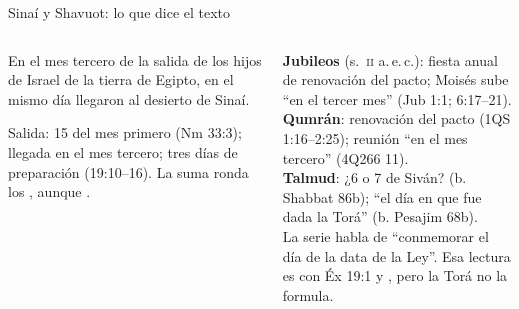 \begin{frame}{Sinaí y Shavuot: lo que dice el texto}
\begin{columns}[t,onlytextwidth]
\begin{column}{0.47\textwidth}
\centering{}\par
\begin{cita}En el mes tercero de la salida de los hijos de Israel de la tierra de Egipto, en el mismo día llegaron al desierto de Sinaí.\end{cita}
\scriptsize\RaggedRight Salida: 15 del mes primero (Nm 33:3); llegada en el mes tercero; tres días de preparación (19:10--16). La suma ronda los , aunque .
\end{column}
\begin{column}{0.51\textwidth}
\begin{tcolorbox}[colback=mostaza!10,colframe=mostaza!85!tierraroja,boxrule=0.6pt,arc=2pt,left=4pt,right=4pt,top=2pt,bottom=2pt,fonttitle=\bfseries\scriptsize,coltitle=caferojizo,colbacktitle=mostaza!30,title={Precisión: ¿desde cuándo es la fiesta del Sinaí?}]
\scriptsize\RaggedRight
\textbf{Jubileos} (s.~\textsc{ii} a.\,e.\,c.): fiesta anual de renovación del pacto; Moisés sube ``en el tercer mes'' (Jub 1:1; 6:17--21).\\
\textbf{Qumrán}: renovación del pacto (1QS 1:16--2:25); reunión ``en el mes tercero'' (4Q266 11).\\
\textbf{Talmud}: ¿6 o 7 de Siván? (b. Shabbat 86b); ``el día en que fue dada la Torá'' (b. Pesajim 68b).\\[2pt]
La serie habla de ``conmemorar el día de la data de la Ley''. Esa lectura es  con Éx 19:1 y , pero la Torá no la formula.
\end{tcolorbox}
\end{column}
\end{columns}
\end{frame}

